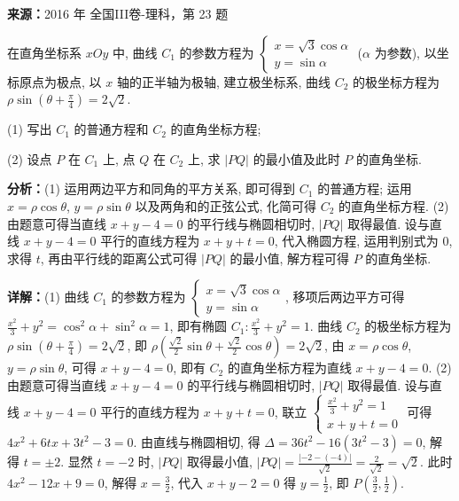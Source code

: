 \begin{question}[points=10]
\textbf{来源：}2016 年 全国III卷-理科，第 23 题\par
[选修4-4：坐标系与参数方程]

在直角坐标系 $xOy$ 中, 曲线 $C_1$ 的参数方程为 $\begin{cases}x=\sqrt{3}\cos\alpha\\ y=\sin\alpha\end{cases}$ ($\alpha$ 为参数), 以坐标原点为极点, 以 $x$ 轴的正半轴为极轴, 建立极坐标系, 曲线 $C_2$ 的极坐标方程为 $\rho\sin(\theta+\frac{\pi}{4})=2\sqrt{2}$.

(1) 写出 $C_1$ 的普通方程和 $C_2$ 的直角坐标方程;

(2) 设点 $P$ 在 $C_1$ 上, 点 $Q$ 在 $C_2$ 上, 求 $|PQ|$ 的最小值及此时 $P$ 的直角坐标.
\begin{solution}

\textbf{分析：}(1) 运用两边平方和同角的平方关系, 即可得到 $C_1$ 的普通方程; 运用 $x=\rho\cos\theta$, $y=\rho\sin\theta$ 以及两角和的正弦公式, 化简可得 $C_2$ 的直角坐标方程. (2) 由题意可得当直线 $x+y-4=0$ 的平行线与椭圆相切时, $|PQ|$ 取得最值. 设与直线 $x+y-4=0$ 平行的直线方程为 $x+y+t=0$, 代入椭圆方程, 运用判别式为 $0$, 求得 $t$, 再由平行线的距离公式可得 $|PQ|$ 的最小值, 解方程可得 $P$ 的直角坐标.

\textbf{详解：}(1) 曲线 $C_1$ 的参数方程为 $\begin{cases}x=\sqrt{3}\cos\alpha\\ y=\sin\alpha\end{cases}$, 移项后两边平方可得 $\frac{x^2}{3}+y^2=\cos^2\alpha+\sin^2\alpha=1$, 即有椭圆 $C_1:\frac{x^2}{3}+y^2=1$. 曲线 $C_2$ 的极坐标方程为 $\rho\sin(\theta+\frac{\pi}{4})=2\sqrt{2}$, 即 $\rho(\frac{\sqrt{2}}{2}\sin\theta+\frac{\sqrt{2}}{2}\cos\theta)=2\sqrt{2}$, 由 $x=\rho\cos\theta$, $y=\rho\sin\theta$, 可得 $x+y-4=0$, 即有 $C_2$ 的直角坐标方程为直线 $x+y-4=0$.
(2) 由题意可得当直线 $x+y-4=0$ 的平行线与椭圆相切时, $|PQ|$ 取得最值. 设与直线 $x+y-4=0$ 平行的直线方程为 $x+y+t=0$, 联立 $\begin{cases}\frac{x^2}{3}+y^2=1\\x+y+t=0\end{cases}$ 可得 $4x^2+6tx+3t^2-3=0$. 由直线与椭圆相切, 得 $\Delta=36t^2-16(3t^2-3)=0$, 解得 $t=\pm2$. 显然 $t=-2$ 时, $|PQ|$ 取得最小值, $|PQ|=\frac{|-2-(-4)|}{\sqrt{2}}=\frac{2}{\sqrt{2}}=\sqrt{2}$. 此时 $4x^2-12x+9=0$, 解得 $x=\frac{3}{2}$, 代入 $x+y-2=0$ 得 $y=\frac{1}{2}$, 即 $P(\frac{3}{2},\frac{1}{2})$.
\end{solution}
\end{question}

